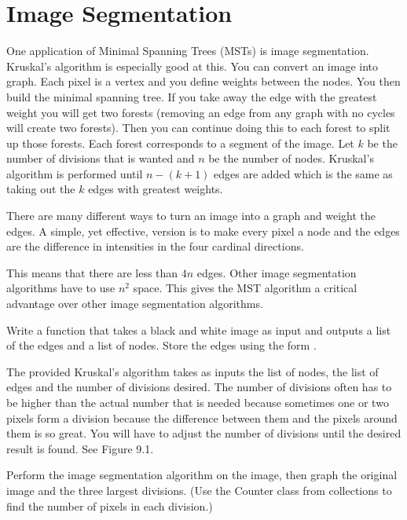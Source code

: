 
\section*{Image Segmentation}


One application of Minimal Spanning Trees (MSTs) is image segmentation.
Kruskal's algorithm is especially good at this.
You can convert an image into graph. Each pixel is a vertex and you define weights between the nodes. You then build the minimal spanning tree. If you take away the edge with the greatest weight you will get two forests (removing an edge from any graph with no cycles will create two forests). Then you can continue doing this to each forest to split up those forests. Each forest corresponds to a segment of the image.
Let $k$ be the number of divisions that is wanted and $n$ be the number of nodes.
Kruskal's algorithm is performed until $n-(k+1)$ edges are added which is the same as taking out the $k$ edges with greatest weights.

There are many different ways to turn an image into a graph and weight the edges.
A simple, yet effective, version is to make every pixel a node and the edges are the difference in intensities in the four cardinal directions. 


This means that there are less than $4n$ edges.
Other image segmentation algorithms have to use $n^2$ space.
This gives the MST algorithm a critical advantage over other image segmentation algorithms. 

\begin{problem}
Write a function that takes a black and white image as input and outputs a list of the edges and a list of nodes.
Store the edges using the form .
\end{problem}

The provided Kruskal's algorithm takes as inputs the list of nodes, the list of edges and the number of divisions desired.
The number of divisions often has to be higher than the actual number that is needed because sometimes one or two pixels form a division because the difference between them and the pixels around them is so great.
You will have to adjust the number of divisions until the desired result is found.  See Figure 9.1.

\begin{problem}
Perform the image segmentation algorithm on the image, then graph the original image and the three largest divisions.
(Use the Counter class from collections to find the number of pixels in each division.) 
\end{problem}

